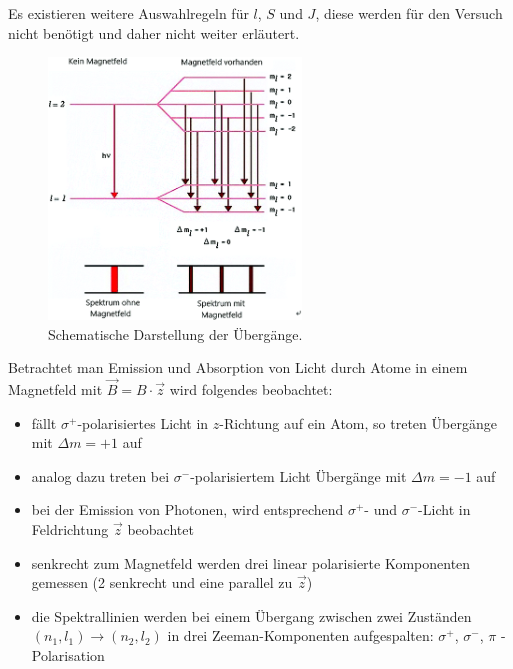 Es existieren weitere Auswahlregeln für $l$, $S$ und $J$, diese werden für den Versuch nicht benötigt und daher nicht weiter erläutert.
\\
\begin{figure}
    \centering
    \includegraphics[width=0.6\textwidth]{content/data/uebergaenge_zeeman.png}
    \caption{Schematische Darstellung der Übergänge. \cite{sternspektren}} %
    \label{fig:uebergaenge}
\end{figure}
Betrachtet man Emission und Absorption von Licht durch Atome in einem Magnetfeld mit $\vec{B} = B \cdot \vec{z}$ wird folgendes beobachtet:

\begin{itemize}
    \item fällt $\sigma^+$-polarisiertes Licht in $z$-Richtung auf ein Atom, so treten Übergänge mit $\Delta m = +1$ auf
    \item analog dazu treten bei $\sigma^-$-polarisiertem Licht Übergänge mit $\Delta m = -1$ auf
    \item bei der Emission von Photonen, wird entsprechend $\sigma^+ $- und $\sigma^-$-Licht in Feldrichtung $\vec{z}$ beobachtet
    \item senkrecht zum Magnetfeld werden drei linear polarisierte Komponenten gemessen (2 senkrecht und eine parallel zu $\vec{z}$)
    \item die Spektrallinien werden bei einem Übergang zwischen zwei Zuständen $(n_1,l_1) \rightarrow (n_2,l_2)$ in drei Zeeman-Komponenten aufgespalten: $\sigma^+$, $\sigma^-$, $\pi$ -Polarisation
\end{itemize}
\FloatBarrier

